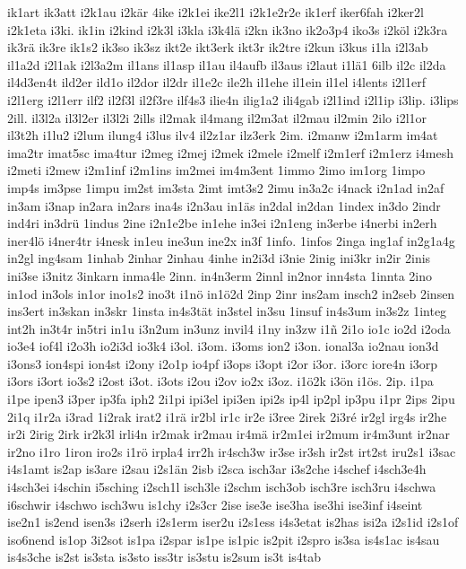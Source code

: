 {ik1art
ik3att
i2k1au
i2kär
4ike
i2k1ei
ike2l1
i2k1e2r2e
ik1erf
iker6fah
i2ker2l
i2k1eta
i3ki.
ik1in
i2kind
i2k3l
i3kla
i3k4lä
i2kn
ik3no
ik2o3p4
iko3s
i2köl
i2k3ra
ik3rä
ik3re
ik1s2
ik3so
ik3sz
ikt2e
ikt3erk
ikt3r
ik2tre
i2kun
i3kus
i1la
i2l3ab
il1a2d
i2l1ak
i2l3a2m
il1ans
il1asp
il1au
il4aufb
il3aus
i2laut
i1lä1
6ilb
il2c
il2da
il4d3en4t
ild2er
ild1o
il2dor
il2dr
il1e2c
ile2h
il1ehe
il1ein
il1el
i4lents
i2l1erf
i2l1erg
i2l1err
ilf2
il2f3l
il2f3re
ilf4s3
ilie4n
ilig1a2
ili4gab
i2l1ind
i2l1ip
i3lip.
i3lips
2ill.
il3l2a
il3l2er
il3l2i
2ills
il2mak
il4mang
il2m3at
il2mau
il2min
2ilo
i2l1or
il3t2h
i1lu2
i2lum
ilung4
i3lus
ilv4
il2z1ar
ilz3erk
2im.
i2manw
i2m1arm
im4at
ima2tr
imat5sc
ima4tur
i2meg
i2mej
i2mek
i2mele
i2melf
i2m1erf
i2m1erz
i4mesh
i2meti
i2mew
i2m1inf
i2m1ins
im2mei
im4m3ent
1immo
2imo
im1org
1impo
imp4s
im3pse
1impu
im2st
im3sta
2imt
imt3s2
2imu
in3a2c
i4nack
i2n1ad
in2af
in3am
i3nap
in2ara
in2ars
ina4s
i2n3au
in1äs
in2dal
in2dan
1index
in3do
2indr
ind4ri
in3drü
1indus
2ine
i2n1e2be
in1ehe
in3ei
i2n1eng
in3erbe
i4nerbi
in2erh
iner4lö
i4ner4tr
i4nesk
in1eu
ine3un
ine2x
in3f
1info.
1infos
2inga
ing1af
in2g1a4g
in2gl
ing4sam
1inhab
2inhar
2inhau
4inhe
in2i3d
i3nie
2inig
ini3kr
in2ir
2inis
ini3se
i3nitz
3inkarn
inma4le
2inn.
in4n3erm
2innl
in2nor
inn4sta
1innta
2ino
in1od
in3ols
in1or
ino1s2
ino3t
i1nö
in1ö2d
2inp
2inr
ins2am
insch2
in2seb
2insen
ins3ert
in3skan
in3skr
1insta
in4s3tät
in3stel
in3su
1insuf
in4s3um
in3s2z
1integ
int2h
in3t4r
in5tri
in1u
i3n2um
in3unz
invil4
i1ny
in3zw
i1ñ
2i1o
io1c
io2d
i2oda
io3e4
iof4l
i2o3h
io2i3d
io3k4
i3ol.
i3om.
i3oms
ion2
i3on.
ional3a
io2nau
ion3d
i3ons3
ion4spi
ion4st
i2ony
i2o1p
io4pf
i3ops
i3opt
i2or
i3or.
i3orc
iore4n
i3orp
i3ors
i3ort
io3s2
i2ost
i3ot.
i3ots
i2ou
i2ov
io2x
i3oz.
i1ö2k
i3ön
i1ös.
2ip.
i1pa
i1pe
ipen3
i3per
ip3fa
iph2
2i1pi
ipi3el
ipi3en
ipi2s
ip4l
ip2pl
ip3pu
i1pr
2ips
2ipu
2i1q
i1r2a
i3rad
1i2rak
irat2
i1rä
ir2bl
ir1c
ir2e
i3ree
2irek
2i3ré
ir2gl
irg4s
ir2he
ir2i
2irig
2irk
ir2k3l
irli4n
ir2mak
ir2mau
ir4mä
ir2m1ei
ir2mum
ir4m3unt
ir2nar
ir2no
i1ro
1iron
iro2s
i1rö
irpla4
irr2h
ir4sch3w
ir3se
ir3sh
ir2st
irt2st
iru2s1
i3sac
i4s1amt
is2ap
is3are
i2sau
i2s1än
2isb
i2sca
isch3ar
i3s2che
i4schef
i4sch3e4h
i4sch3ei
i4schin
i5sching
i2sch1l
isch3le
i2schm
isch3ob
isch3re
isch3ru
i4schwa
i6schwir
i4schwo
isch3wu
is1chy
i2s3cr
2ise
ise3e
ise3ha
ise3hi
ise3inf
i4seint
ise2n1
is2end
isen3s
i2serh
i2s1erm
iser2u
i2s1ess
i4s3etat
is2has
isi2a
i2s1id
i2s1of
iso6nend
is1op
3i2sot
is1pa
i2spar
is1pe
is1pic
is2pit
i2spro
is3sa
is4s1ac
is4sau
is4s3che
is2st
is3sta
is3sto
iss3tr
is3stu
is2sum
is3t
is4tab
}
